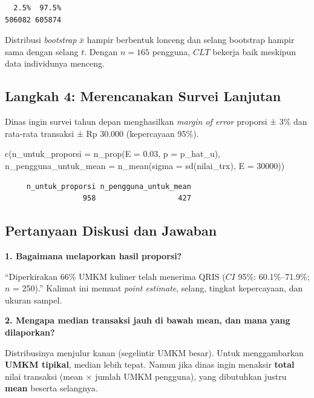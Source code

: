 \documentclass[
  indonesian,
  letterpaper,
]{book}
\newenvironment{Shaded}{\begin{snugshade}}{\end{snugshade}}
\newcommand{\AttributeTok}[1]{\textcolor[rgb]{0.40,0.45,0.13}{#1}}
\newcommand{\DecValTok}[1]{\textcolor[rgb]{0.68,0.00,0.00}{#1}}
\newcommand{\FloatTok}[1]{\textcolor[rgb]{0.68,0.00,0.00}{#1}}
\newcommand{\FunctionTok}[1]{\textcolor[rgb]{0.28,0.35,0.67}{#1}}
\newcommand{\NormalTok}[1]{\textcolor[rgb]{0.00,0.23,0.31}{#1}}
\begin{document}
\begin{verbatim}
  2.5%  97.5% 
506082 605874 
\end{verbatim}

Distribusi \emph{bootstrap} \(\bar{x}\) hampir berbentuk lonceng dan
selang bootstrap hampir sama dengan selang \(t\). Dengan \(n = 165\)
pengguna, \(CLT\) bekerja baik meskipun data individunya menceng.

\subsection{Langkah 4: Merencanakan Survei
Lanjutan}\label{langkah-4-merencanakan-survei-lanjutan}

Dinas ingin survei tahun depan menghasilkan \emph{margin of error}
proporsi ± 3\% dan rata-rata transaksi ± Rp 30.000 (kepercayaan 95\%).

\begin{Shaded}
\begin{Highlighting}[]
\FunctionTok{c}\NormalTok{(}\AttributeTok{n\_untuk\_proporsi =} \FunctionTok{n\_prop}\NormalTok{(}\AttributeTok{E =} \FloatTok{0.03}\NormalTok{, }\AttributeTok{p =}\NormalTok{ p\_hat\_u),}
\AttributeTok{n\_pengguna\_untuk\_mean =} \FunctionTok{n\_mean}\NormalTok{(}\AttributeTok{sigma =} \FunctionTok{sd}\NormalTok{(nilai\_trx), }\AttributeTok{E =} \DecValTok{30000}\NormalTok{))}
\end{Highlighting}
\end{Shaded}

\begin{verbatim}
     n_untuk_proporsi n_pengguna_untuk_mean 
                  958                   427 
\end{verbatim}

\subsection{Pertanyaan Diskusi dan
Jawaban}\label{pertanyaan-diskusi-dan-jawaban}

\textbf{1. Bagaimana melaporkan hasil proporsi?}

``Diperkirakan 66\% UMKM kuliner telah menerima QRIS (\(CI\) 95\%:
60.1\%--71.9\%; \(n\) = 250).'' Kalimat ini memuat \emph{point
estimate}, selang, tingkat kepercayaan, dan ukuran sampel.

\textbf{2. Mengapa median transaksi jauh di bawah mean, dan mana yang
dilaporkan?}

Distribusinya menjulur kanan (segelintir UMKM besar). Untuk
menggambarkan \textbf{UMKM tipikal}, median lebih tepat. Namun jika
dinas ingin menaksir \textbf{total} nilai transaksi (mean × jumlah UMKM
pengguna), yang dibutuhkan justru \textbf{mean} beserta selangnya.
\end{document}
